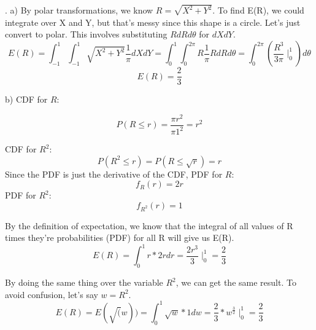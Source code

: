 \documentclass[11pt]{article}
\begin{document}
    
\bigskip

. 
\smallskip
    a) By polar transformations, we know $R = \sqrt{X^2 + Y^2}$.  To find E(R), we could integrate over X and Y, but that's messy since this shape is a circle.  Let's just convert to polar. This involves substituting $RdRd\theta$ for $dXdY$. 
    $$E(R) = \int_{-1}^1\int_{-1}^1 \sqrt{X^2 + Y^2}\frac{1}{\pi}dXdY = \int_0^1\int_0^{2\pi}R\frac{1}{\pi} RdRd\theta = \int_0^{2\pi}(\frac{R^3}{3\pi}\mid_0^1)d\theta$$
    $$\boxed{E(R) = \frac{2}{3}}$$
\smallskip

    b) CDF for $R$: 

    	$$P(R\le r) = \frac{\pi r^2}{\pi 1^2} = r^2$$

    	CDF for $R^2$: 
    	$$P(R^2 \le r) = P(R \le \sqrt{r}) = r$$
    	Since the PDF is just the derivative of the CDF, 
    	PDF for $R$: 
    	$$f_R(r) = 2r$$
    	PDF for $R^2$:
    	$$f_{R^2}(r) = 1$$

    	By the definition of expectation, we know that the integral of all values of R times they're probabilities (PDF) for all R will give us E(R).
    	$$E(R) = \int_0^1 r*2rdr = \frac{2r^3}{3}\mid_0^1 = \boxed{\frac{2}{3}}$$

    	By doing the same thing over the variable $R^2$, we can get the same result. To avoid confusion, let's say $w = R^2$.
    	$$ E(R) = E(\sqrt(w)) = \int_0^1 \sqrt{w}*1dw = \frac{2}{3}*w^{\frac{3}{2}}\mid_0^1 = \boxed{ \frac{2}{3} }$$

\bigskip

\noindent 


\bigskip
\end{document}
